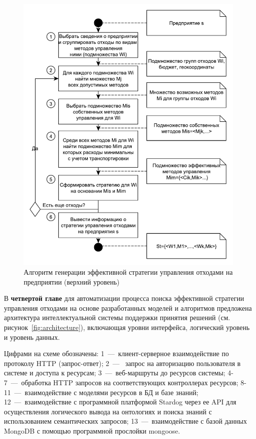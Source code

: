 \documentclass[a4paper]{G2-105}
\begin{document}
\begin{figure}[H]
\centering
\includegraphics[scale=0.6]{algorithm}
\caption{Алгоритм генерации эффективной стратегии управления отходами на предприятии (верхний уровень)}
\label{fig:algorithm}
\end{figure}

В \textbf{четвертой главе} для автоматизации процесса поиска эффективной стратегии управления отходами на основе разработанных моделей и алгоритмов предложена архитектура интеллектуальной системы поддержки принятия решений (см. рисунок~\ref{fig:architecture}), включающая уровни интерфейса, логический уровень и уровень данных.

Цифрами на схеме обозначены: 1~---~клиент-серверное взаимодействие по протоколу HTTP (запрос-ответ); 2~---~ запрос на авторизацию пользователя в системе и доступа к ресурсам; 3~---~веб-маршруты до ресурсов системы; 4-7~---~обработка HTTP запросов на соответствующих контроллерах ресурсов; 8-11~---~взаимодействие с моделями ресурсов в БД и базе знаний; 12~---~взаимодействие с программной платформой Stardog через ее API для осуществления логического вывода на онтологиях и поиска знаний с использованием семантических запросов; 13~---~взаимодействие с базой данных MongoDB с помощью программной прослойки mongoose.
\end{document}

